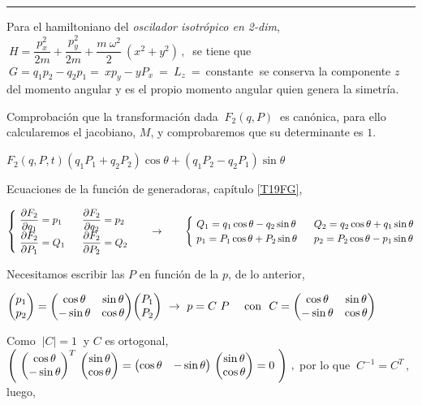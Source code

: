 \rule{200pt}{0.1pt}

\vspace{5mm} Para el hamiltoniano del \emph{oscilador isotrópico en 2-dim},
$\ H=\dfrac{p_x^2}{2m}+\dfrac{p_y^2}{2m}+\dfrac{m\ \omega^2}{2} \ (x^2+y^2)\, , \ $
se tiene que $\ G=q_1p_2-q_2p_1= \ xp_y-yP_x \ = \ L_z \ = \ \text{constante} \ $ se conserva la componente $z$ del momento angular y es el propio momento angular quien genera la simetría.

\vspace{1.5cm}
\color{NavyBlue}
\begin{ejercicio}
	\textcolor{NavyBlue}{Comprobación que la transformación dada $\ F_2(q,P) \ $ es canónica, para ello calcularemos el jacobiano, $M$, y comprobaremos que su determinante es $1$.}
\end{ejercicio}



\vspace{5mm}

$F_2(q,P,t)(q_1P_1+q_2P_2)\cos \theta + (q_1P_2-q_2P_1)\sin \theta $

Ecuaciones de la función de generadoras, capítulo \ref{T19FG},

$\begin{cases}
\ \displaystyle \pdv{F_2}{q_1}=p_1 & \ \ \displaystyle \pdv{F_2}{q_2}=p_2 \\
\ \displaystyle \pdv{F_2	}{P_1}=Q_1 & \ \ \displaystyle \pdv{F_2}{P_2}=Q_2
\end{cases} \qquad \to \qquad 
\begin{cases}
\ Q_1=q_1\cos \theta - q_2 \sin \theta & \ \ Q_2=q_2\cos \theta+q_1\sin \theta \\
\ p_1=P_1 \cos \theta +P_2 \sin \theta & \ \ p_2=P_2\cos \theta - p_1 \sin \theta 
\end{cases}$

Necesitamos escribir las $P$ en función de la $p$, de lo anterior,

$\mqty(p_1\\p_2)=\mqty(\cos \theta & \sin \theta \\-\sin \theta & \cos \theta) \mqty(P_1 \\ P_2) \ \to  \ p=C\ P \quad \text{ con } \ C= \mqty(\cos \theta & \sin \theta \\-\sin \theta & \cos \theta) $

Como $\ |C|=1 \ $ y $C$ es ortogonal, $\left( \  \mqty(\cos \theta \\ -\sin \theta)^T \ \mqty(\sin \theta \\ \cos \theta)=
\mqty(\cos \theta & -\sin \theta) \ \mqty(\sin \theta \\ \cos \theta)=0 \ \right) \, , $ por lo que $\ C^{-1}=C^T\, , \ $ luego,

